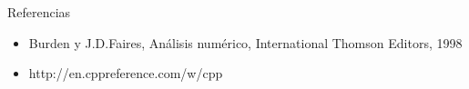 \begin{section}{Referencias}
	\begin{itemize}
		\item Burden y J.D.Faires, Análisis numérico, International Thomson Editors, 1998
	
		\item http://en.cppreference.com/w/cpp
	\end{itemize}
\end{section}
